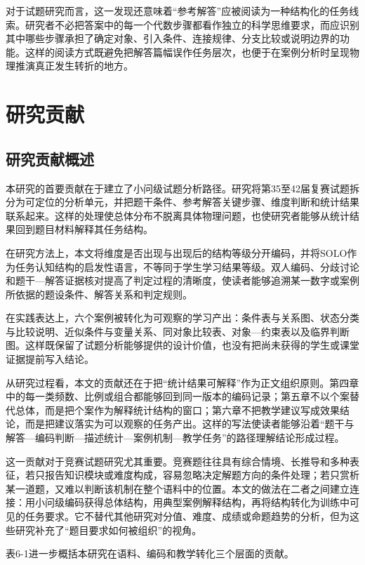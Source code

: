 \documentclass[
  12pt,
  a4paper]{ctexbook}
\begin{document}
对于试题研究而言，这一发现还意味着``参考解答''应被阅读为一种结构化的任务线索。研究者不必把答案中的每一个代数步骤都看作独立的科学思维要求，而应识别其中哪些步骤承担了确定对象、引入条件、连接规律、分支比较或说明边界的功能。这样的阅读方式既避免把解答篇幅误作任务层次，也便于在案例分析时呈现物理推演真正发生转折的地方。

\section{研究贡献}\label{ux7814ux7a76ux8d21ux732e}

\subsection{研究贡献概述}\label{ux7814ux7a76ux8d21ux732eux6982ux8ff0}

本研究的首要贡献在于建立了小问级试题分析路径。研究将第35至42届复赛试题拆分为可定位的分析单元，并把题干条件、参考解答关键步骤、维度判断和统计结果联系起来。这样的处理使总体分布不脱离具体物理问题，也使研究者能够从统计结果回到题目材料解释其任务结构。

在研究方法上，本文将维度是否出现与出现后的结构等级分开编码，并将SOLO作为任务认知结构的启发性语言，不等同于学生学习结果等级。双人编码、分歧讨论和题干---解答证据核对提高了判定过程的清晰度，使读者能够追溯某一数字或案例所依据的题设条件、解答关系和判定规则。

在实践表达上，六个案例被转化为可观察的学习产出：条件表与关系图、状态分类与比较说明、近似条件与变量关系、同对象比较表、对象---约束表以及临界判断图。这样既保留了试题分析能够提供的设计价值，也没有把尚未获得的学生或课堂证据提前写入结论。

从研究过程看，本文的贡献还在于把``统计结果可解释''作为正文组织原则。第四章中的每一类频数、比例或组合都能够回到同一版本的编码记录；第五章不以个案替代总体，而是把个案作为解释统计结构的窗口；第六章不把教学建议写成效果结论，而是把建议落实为可以观察的任务产出。这样的写法使读者能够沿着``题干与解答---编码判断---描述统计---案例机制---教学任务''的路径理解结论形成过程。

这一贡献对于竞赛试题研究尤其重要。竞赛题往往具有综合情境、长推导和多种表征，若只报告知识模块或难度构成，容易忽略决定解题方向的条件处理；若只赏析某一道题，又难以判断该机制在整个语料中的位置。本文的做法在二者之间建立连接：用小问级编码获得总体结构，用典型案例解释结构，再将结构转化为训练中可见的任务要求。它不替代其他研究对分值、难度、成绩或命题趋势的分析，但为这些研究补充了``题目要求如何被组织''的视角。

表6-1进一步概括本研究在语料、编码和教学转化三个层面的贡献。
\end{document}
